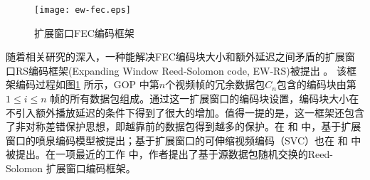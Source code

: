 \begin{figure}[htbp]
  \centering
  \texttt{[image: ew-fec.eps]}
  \caption{扩展窗口FEC编码框架}
  \label{fig:ew_fec}
\end{figure}

随着相关研究的深入，一种能解决FEC编码块大小和额外延迟之间矛盾的扩展窗口RS编码框架(Expanding Window Reed-Solomon code, EW-RS)被提出 \cite{sejdinovic2009expanding}。 该框架编码过程如图\ref{fig:ew_fec} 所示，GOP 中第$n$个视频帧的冗余数据包$C_n$包含的编码块由第$1\le i\le n$ 帧的所有数据包组成。通过这一扩展窗口的编码块设置，编码块大小在不引入额外播放延迟的条件下得到了很大的增加。值得一提的是，这一框架还包含了非对称差错保护思想，即越靠前的数据包得到越多的保护。在\cite{sejdinovic2009expanding} 和 \cite{nazir2011expanding} 中，基于扩展窗口的喷泉编码模型被提出；基于扩展窗口的可伸缩视频编码（SVC）也在\cite{vukobratovic2009scalable} 和 \cite{hellge2011layer} 中被提出。在一项最近的工作\cite{xiao2013real} 中，作者提出了基于源数据包随机交换的Reed-Solomon 扩展窗口编码框架。
